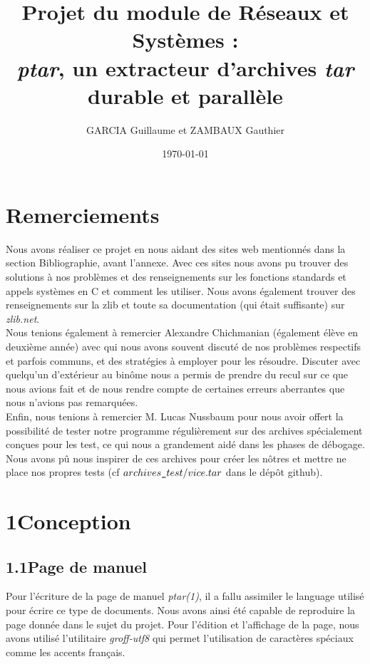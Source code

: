 \documentclass[12pt, a4paper]{report}
\title{Projet du module de Réseaux et Systèmes :\\ \textit{ptar}, un extracteur d'archives \textit{tar} durable et parallèle}
\author{GARCIA  Guillaume et ZAMBAUX Gauthier}
\date{\today}
\begin{document}
\maketitle


\chapter*{Remerciements}

\hspace{1cm}Nous avons réaliser ce projet en nous aidant des sites web mentionnés dans la section Bibliographie, avant l'annexe. Avec ces sites nous avons pu trouver des solutions à nos problèmes et des renseignements sur les fonctions standards et appels systèmes en C et comment les utiliser. Nous avons également trouver des renseignements sur la zlib et toute sa documentation (qui était suffisante) sur \textit{zlib.net}.\\

\hspace{0.5cm}Nous tenions également à remercier Alexandre Chichmanian (également élève en deuxième année) avec qui nous avons souvent discuté de nos problèmes respectifs et parfois communs, et des stratégies à employer pour les résoudre. Discuter avec quelqu'un d'extérieur au binôme nous a permis de prendre du recul sur ce que nous avions fait et de nous rendre compte de certaines erreurs aberrantes que nous n'avions pas remarquées.\\

\hspace{0.5cm}Enfin, nous tenions à remercier M. Lucas Nussbaum pour nous avoir offert la possibilité de tester notre programme régulièrement sur des archives spécialement conçues pour les test, ce qui nous a grandement aidé dans les phases de débogage. Nous avons pû nous inspirer de ces archives pour créer les nôtres et mettre ne place nos propres tests (cf $archives\verb|_|test/vice.tar$ dans le dépôt github).


\chapter*{1\hspace{1cm}Conception}

\section*{\hspace{0.6cm}1.1\hspace{0.6cm}Page de manuel}
\hspace{1cm}Pour l'écriture de la page de manuel \textit{ptar(1)}, il a fallu assimiler le language utilisé pour écrire ce type de documents. Nous avons ainsi été capable de reproduire la page donnée dans le sujet du projet. Pour l'édition et l'affichage de la page, nous avons utilisé l'utilitaire \textit{groff-utf8} qui permet l'utilisation de caractères spéciaux comme les accents français. \\
\end{document}

